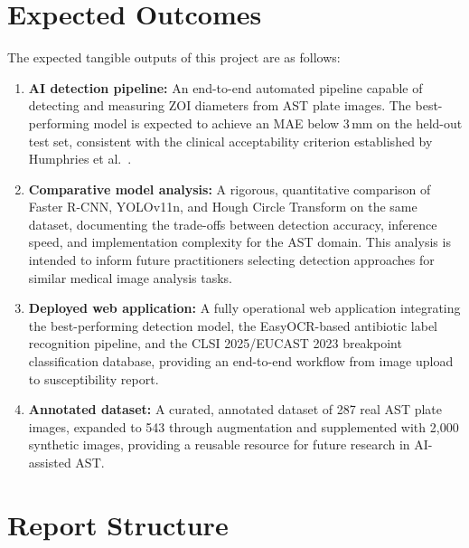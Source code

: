 \section{Expected Outcomes}

The expected tangible outputs of this project are as follows:

\begin{enumerate}
  \item \textbf{AI detection pipeline:} An end-to-end automated pipeline capable of detecting and
        measuring ZOI diameters from AST plate images. The best-performing model is expected to
        achieve an MAE below 3\,mm on the held-out test set, consistent with the clinical
        acceptability criterion established by Humphries et al.\ \cite{humphries2018}.

  \item \textbf{Comparative model analysis:} A rigorous, quantitative comparison of Faster R-CNN,
        YOLOv11n, and Hough Circle Transform on the same dataset, documenting the trade-offs
        between detection accuracy, inference speed, and implementation complexity for the AST
        domain. This analysis is intended to inform future practitioners selecting detection
        approaches for similar medical image analysis tasks.

  \item \textbf{Deployed web application:} A fully operational web application integrating the
        best-performing detection model, the EasyOCR-based antibiotic label recognition pipeline,
        and the CLSI 2025/EUCAST 2023 breakpoint classification database, providing an end-to-end
        workflow from image upload to susceptibility report.

  \item \textbf{Annotated dataset:} A curated, annotated dataset of 287 real AST plate images,
        expanded to 543 through augmentation and supplemented with 2,000 synthetic images,
        providing a reusable resource for future research in AI-assisted AST.
\end{enumerate}

\section{Report Structure}


